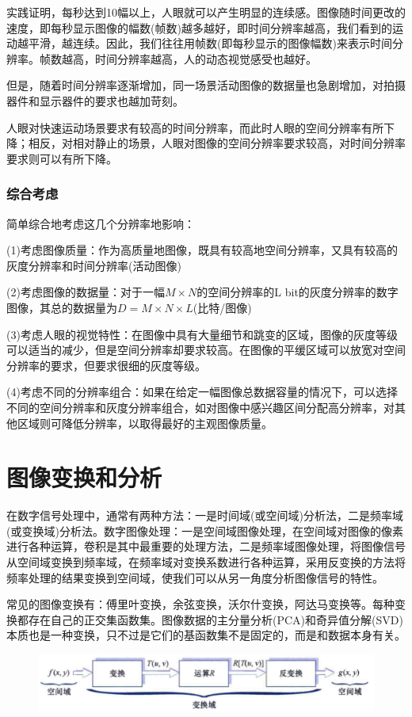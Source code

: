 \documentclass[11pt]{article}
\begin{document}
实践证明，每秒达到10幅以上，人眼就可以产生明显的连续感。图像随时间更改的速度，即每秒显示图像的幅数(帧数)越多越好，即时间分辨率越高，我们看到的运动越平滑，越连续。因此，我们往往用帧数(即每秒显示的图像幅数)来表示时间分辨率。帧数越高，时间分辨率越高，人的动态视觉感受也越好。

但是，随着时间分辨率逐渐增加，同一场景活动图像的数据量也急剧增加，对拍摄器件和显示器件的要求也越加苛刻。

人眼对快速运动场景要求有较高的时间分辨率，而此时人眼的空间分辨率有所下降；相反，对相对静止的场景，人眼对图像的空间分辨率要求较高，对时间分辨率要求则可以有所下降。
\subsubsection{综合考虑}
简单综合地考虑这几个分辨率地影响：

\noindent(1)考虑图像质量：作为高质量地图像，既具有较高地空间分辨率，又具有较高的灰度分辨率和时间分辨率(活动图像)

\noindent(2)考虑图像的数据量：对于一幅$M\times N$的空间分辨率的L bit的灰度分辨率的数字图像，其总的数据量为$D=M\times N\times L$(比特/图像)

\noindent(3)考虑人眼的视觉特性：在图像中具有大量细节和跳变的区域，图像的灰度等级可以适当的减少，但是空间分辨率却要求较高。在图像的平缓区域可以放宽对空间分辨率的要求，但要求很细的灰度等级。

\noindent(4)考虑不同的分辨率组合：如果在给定一幅图像总数据容量的情况下，可以选择不同的空间分辨率和灰度分辨率组合，如对图像中感兴趣区间分配高分辨率，对其他区域则可降低分辨率，以取得最好的主观图像质量。

\section{图像变换和分析}
在数字信号处理中，通常有两种方法：一是时间域(或空间域)分析法，二是频率域(或变换域)分析法。数字图像处理：一是空间域图像处理，在空间域对图像的像素进行各种运算，卷积是其中最重要的处理方法，二是频率域图像处理，将图像信号从空间域变换到频率域，在频率域对变换系数进行各种运算，采用反变换的方法将频率处理的结果变换到空间域，使我们可以从另一角度分析图像信号的特性。

常见的图像变换有：傅里叶变换，余弦变换，沃尔什变换，阿达马变换等。每种变换都存在自己的正交集函数集。图像数据的主分量分析(PCA)和奇异值分解(SVD)本质也是一种变换，只不过是它们的基函数集不是固定的，而是和数据本身有关。

\begin{figure}[H]
	\centering
	\includegraphics[scale=0.6]{57}
\end{figure}
\end{document}
